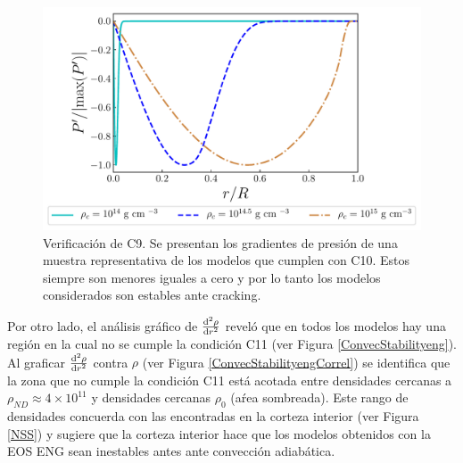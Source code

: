 \begin{figure}[H]
    \centering
    \includegraphics[width=0.93\linewidth]{figures/CrackStabilityeng.pdf}
    \caption{Verificación de C9. Se presentan los gradientes de presión de una muestra representativa de los modelos que cumplen con C10. Estos siempre son menores  iguales a cero  y por lo tanto los modelos considerados son estables ante cracking.}
    \label{CrackStabilityeng}
\end{figure}

Por otro lado, el análisis gráfico de $\dv[2]{\rho}{r}$ reveló que en todos los modelos hay una región en la cual no se cumple la condición C11 (ver Figura \ref{ConvecStabilityeng}). Al graficar $\dv[2]{\rho}{r}$ contra $\rho$ (ver Figura \ref{ConvecStabilityengCorrel}) se identifica que la zona que no cumple la condición C11 está acotada entre densidades cercanas a $\rho_{ND}\approx 4 \times 10^{11} $ y densidades cercanas $\rho_0$ (aŕea sombreada). Este rango de densidades concuerda con las encontradas en la corteza interior (ver Figura \ref{NSS}) y sugiere que la corteza interior hace que los modelos obtenidos con la EOS ENG sean inestables antes ante convección adiabática. 

